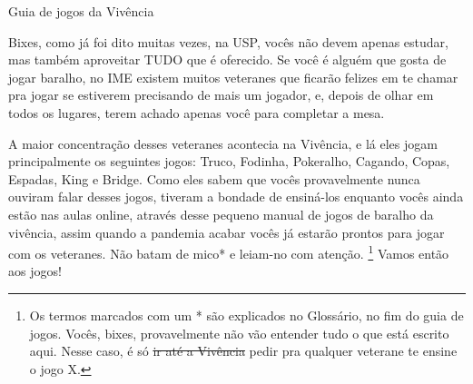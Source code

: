 \begin{secao}{Guia de jogos da Vivência }


Bixes, como já foi dito muitas vezes, na USP, vocês não devem apenas estudar, mas
também aproveitar TUDO que é oferecido. Se você é alguém que gosta de jogar
baralho, no IME existem muitos veteranes que ficarão felizes em te chamar pra
jogar se estiverem precisando de mais um jogador, e, depois de olhar em todos
os lugares, terem achado apenas você para completar a mesa. 

A maior concentração desses veteranes acontecia na Vivência, e lá eles jogam
principalmente os seguintes jogos: Truco, Fodinha, Pokeralho, Cagando, Copas, Espadas,
King e Bridge. Como eles sabem que vocês provavelmente nunca ouviram falar desses jogos,
tiveram a bondade de ensiná-los enquanto vocês ainda estão nas aulas online, através desse
pequeno manual de jogos de baralho da vivência, assim quando a pandemia acabar vocês já estarão prontos para jogar com os veteranes. Não batam de mico* e
leiam-no com atenção. \footnote{Os termos marcados com um * são explicados no Glossário, no fim do guia de
jogos. Vocês, bixes, provavelmente não vão entender tudo o que está escrito aqui.
Nesse caso, é só \sout{ir até a Vivência} pedir pra qualquer 
veterane te ensine o jogo X.}
Vamos então aos jogos!






\pagebreak

\pagebreak




\end{secao}
